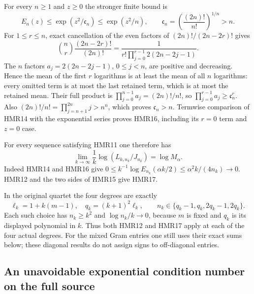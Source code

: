 \documentclass[11pt,a4paper]{article}
\begin{document}
For every $n\geq1$ and $z\geq0$ the stronger finite bound is
\[
 \boxed{\displaystyle
 E_n(z)\leq\exp(z^2/\mathfrak c_n)\leq\exp(z^2/n),
 \qquad \mathfrak c_n=\left(\frac{(2n)!}{n!}\right)^{1/n}>n.}
 \tag{HMR16}
\]
For $1\leq r\leq n$, exact cancellation of the even
factors of $(2n)!/(2n-2r)!$ gives
\[
 \binom nr\frac{(2n-2r)!}{(2n)!}
 =\frac1{r!\prod_{j=0}^{r-1}2(2n-2j-1)}.
\]
The $n$ factors $a_j=2(2n-2j-1)$, $0\leq j<n$,
are positive and decreasing. Hence the mean of the
first $r$ logarithms is at least the mean of all
$n$ logarithms: every omitted term is at most
the last retained term, which is at most the
retained mean. Their full product is
$\prod_{j=0}^{n-1}a_j=(2n)!/n!$, so
$\prod_{j=0}^{r-1}a_j\geq\mathfrak c_n^r$.
Also $(2n)!/n!=\prod_{j=n+1}^{2n}j>n^n$,
which proves $\mathfrak c_n>n$.
Termwise comparison of HMR14 with the exponential
series proves HMR16, including its $r=0$ term
and $z=0$ case.

For every sequence satisfying HMR11 one therefore has
\[
 \boxed{\displaystyle
 \lim_{k\to\infty}\frac1k\log(L_{k,n_k}/J_{n_k})
 =\log M_\alpha.}
 \tag{HMR17}
\]
Indeed HMR14 and HMR16 give
$0\leq k^{-1}\log E_{n_k}(\alpha k/2)
\leq\alpha^2k/(4n_k)\to0$.
HMR12 and the two sides of HMR15 give HMR17.

In the original quartet the four degrees are exactly
\[
 \ell_k=1+k(m-1),\quad q_k=(k+1)^2\ell_k,\qquad
 n_k\in\{q_k-1,q_k,2q_k-1,2q_k\}.
 \tag{HMR18}
\]
Each such choice has $n_k\geq k^2$ and $\log n_k/k\to0$,
because $m$ is fixed and $q_k$ is its displayed polynomial
in $k$. Thus both HMR12 and HMR17 apply at each of the
four actual degrees. For the mixed Gram entries one still
uses their exact sums below; these diagonal results do not
assign signs to off-diagonal entries.

\subsection{An unavoidable exponential condition number on the full source}
\end{document}
